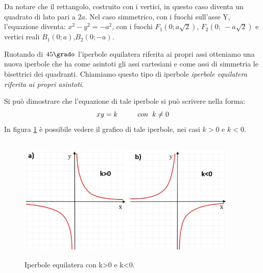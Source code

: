\vspace{12pt}
Da notare che il rettangolo, costruito con i vertici, in questo caso diventa un quadrato di lato pari a \(2a\).
Nel caso simmetrico, con i fuochi sull'asse Y, l'equazione diventa:
\( x^{2} - y^{2} =- a^{2} \), con i fuochi 
\( F_{1} \left(0; a \sqrt{2}\right)\), \( F_{2} \left(0;~-a \sqrt{2}\right)\) 
e vertici reali \( B_{1} (0; a)\),\( B_{2} (0; -a)\).

\vspace{7pt}

Ruotando di \(45\grado\) l'iperbole equilatera riferita ai propri 
assi otteniamo una nuova iperbole che ha come asintoti gli assi cartesiani 
e come assi di simmetria le bisettrici dei quadranti.
Chiamiamo questo tipo 
di iperbole \emph{iperbole equilatera riferita ai propri asintoti}.

Si può dimostrare che l'equazione di tale iperbole si può scrivere nella 
forma: 
\begin{equation}
x y=k \hspace{1cm} con \hspace{0.2cm}k \neq 0
\end{equation}
In figura \ref{fig:iperboleequilatera} è possibile vedere il grafico di tale iperbole, nei casi \(k>0\) e \(k<0\).
\begin{figure}[!h]
  \centering
  \includegraphics[height=6cm, width=10.5cm]{img/equilatera2.jpg}
  \caption{Iperbole equilatera con k>0 e k<0.}
  \label{fig:iperboleequilatera}
\end{figure}

\vspace{7pt}

